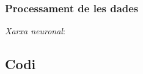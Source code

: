 \documentclass[12pt]{article}
\begin{document}
\subsubsection{Processament de les dades}

\clearpage
\begin{thebibliography}{9}
	\textit{Xarxa neuronal}:
  	\\
\end{thebibliography}

\clearpage
\begin{appendices}
\section{Codi}
\end{appendices}
\end{document}

